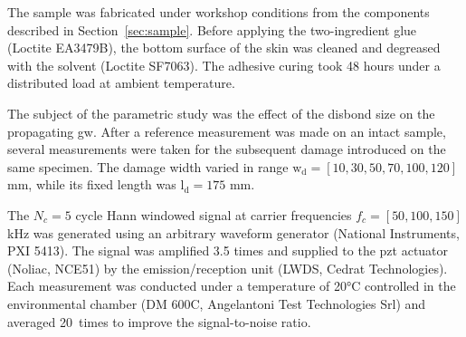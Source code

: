 The sample was fabricated under workshop conditions from the components described in Section~\ref{sec:sample}.
Before applying the two-ingredient glue (Loctite EA3479B), the bottom surface of the skin was cleaned and degreased with the solvent (Loctite SF7063).
The adhesive curing took 48 hours under a distributed load at ambient temperature.

The subject of the parametric study was the effect of the disbond size on the propagating \ac{gw}.
After a reference measurement was made on an intact sample, several measurements were taken for the subsequent damage introduced on the same specimen.
The damage width varied in range \(\mathrm{w_d}=\left [10, 30, 50, 70, 100, 120 \right ]\) \unit{\mm}, while its fixed length was \(\mathrm{l_d} = 175\) \unit{\mm}.

The \(N_c=5\) cycle Hann windowed signal at carrier frequencies \(f_c=[50,100,150]\) \unit{\kHz} was generated using an arbitrary waveform generator (National Instruments, PXI 5413).
The signal was amplified 3.5 times and supplied to the \ac{pzt} actuator (Noliac, NCE51) by the emission/reception unit (LWDS, Cedrat Technologies).
Each measurement was conducted under a temperature of 20\unit{\degreeCelsius} controlled in the environmental chamber (DM 600C, Angelantoni Test Technologies Srl) and averaged 20~times to improve the signal-to-noise ratio.